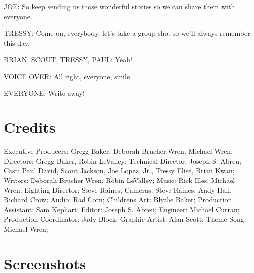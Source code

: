 JOE:
So keep sending us those wonderful stories so we can share them with everyone.

TRESSY:
Come on, everybody, let's take a group shot so we'll always remember this day.

BRIAN, SCOUT, TRESSY, PAUL:
Yeah!

VOICE OVER:
All right, everyone, smile

EVERYONE:
Write away!

\section{Credits}

Executive Producers: Gregg Baker, Deborah Brucher Wren, Michael Wren;
Directors: Gregg Baker, Robin LeValley;
Technical Director: Joseph S. Abreu;
Cast: Paul David, Scout Jackson, Joe Lopez, Jr., Tressy Elise, Brian Kwan;
Writers: Deborah Brucher Wren, Robin LeValley;
Music: Rick Illes, Michael Wren;
Lighting Director: Steve Raines;
Cameras: Steve Raines, Andy Hall, Richard Crow;
Audio: Rad Corn;
Childrens Art: Blythe Baker;
Production Assistant: Sam Kephart;
Editor: Joseph S. Abreu;
Engineer: Michael Curran;
Production Coordinator: Judy Block;
Graphic Artist: Alan Scott;
Theme Song: Michael Wren;

\section{Screenshots}

